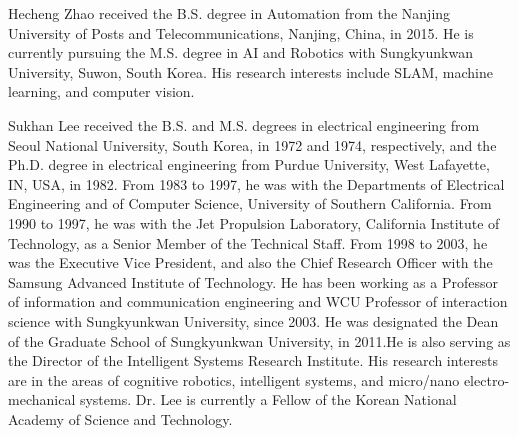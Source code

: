 \documentclass{ieeeaccess}
\begin{document}



\begin{IEEEbiography}{Hecheng Zhao} received the B.S. degree
in Automation from
the Nanjing University of Posts and Telecommunications,
Nanjing, China, in 2015. He is currently pursuing the M.S. degree in AI and Robotics with Sungkyunkwan University,
Suwon, South Korea.
His research interests include SLAM, machine learning, and computer vision.
\end{IEEEbiography}

\begin{IEEEbiography}{Sukhan Lee}  received the B.S. and M.S. degrees
in electrical engineering from Seoul National
University, South Korea, in 1972 and 1974, respectively, and the Ph.D. degree in electrical engineering from Purdue University, West Lafayette, IN,
USA, in 1982.
From 1983 to 1997, he was with the Departments of Electrical Engineering and of Computer
Science, University of Southern California. From
1990 to 1997, he was with the Jet Propulsion
Laboratory, California Institute of Technology, as a Senior Member of the
Technical Staff. From 1998 to 2003, he was the Executive Vice President,
and also the Chief Research Officer with the Samsung Advanced Institute
of Technology. He has been working as a Professor of information and
communication engineering and WCU Professor of interaction science with
Sungkyunkwan University, since 2003. He was designated the Dean of the
Graduate School of Sungkyunkwan University, in 2011.He is also serving
as the Director of the Intelligent Systems Research Institute. His research
interests are in the areas of cognitive robotics, intelligent systems, and
micro/nano electro-mechanical systems.
Dr. Lee is currently a Fellow of the Korean National Academy of Science
and Technology.
\end{IEEEbiography}

\EOD
\end{document}
